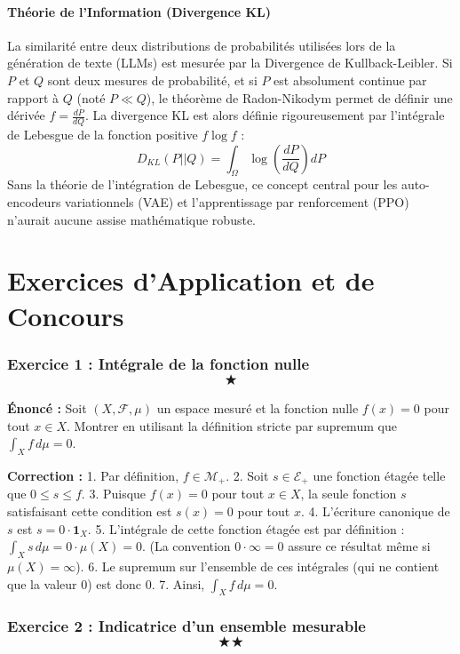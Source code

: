 \documentclass[11pt,a4paper]{article}
\begin{document}
\subsection{Théorie de l'Information (Divergence KL)}

La similarité entre deux distributions de probabilités utilisées lors de la génération de texte (LLMs) est mesurée par la Divergence de Kullback-Leibler. Si $P$ et $Q$ sont deux mesures de probabilité, et si $P$ est absolument continue par rapport à $Q$ (noté $P \ll Q$), le théorème de Radon-Nikodym permet de définir une dérivée $f = \frac{dP}{dQ}$.
La divergence KL est alors définie rigoureusement par l'intégrale de Lebesgue de la fonction positive $f \log f$ :
$$D_{KL}(P || Q) = \int_{\Omega} \log\left(\frac{dP}{dQ}\right) dP$$
Sans la théorie de l'intégration de Lebesgue, ce concept central pour les auto-encodeurs variationnels (VAE) et l'apprentissage par renforcement (PPO) n'aurait aucune assise mathématique robuste.


\newpage
\part{Exercices d'Application et de Concours}
\section{Exercice 1 : Intégrale de la fonction nulle \quad $$\bigstar$$}

\textbf{Énoncé :}
Soit $(X, \mathcal{F}, \mu)$ un espace mesuré et la fonction nulle $f(x) = 0$ pour tout $x \in X$.
Montrer en utilisant la définition stricte par supremum que $\int_X f \, d\mu = 0$.

\textbf{Correction :}
1. Par définition, $f \in \mathcal{M}_+$.
2. Soit $s \in \mathcal{E}_+$ une fonction étagée telle que $0 \le s \le f$.
3. Puisque $f(x) = 0$ pour tout $x \in X$, la seule fonction $s$ satisfaisant cette condition est $s(x) = 0$ pour tout $x$.
4. L'écriture canonique de $s$ est $s = 0 \cdot \mathbf{1}_X$.
5. L'intégrale de cette fonction étagée est par définition : $\int_X s \, d\mu = 0 \cdot \mu(X) = 0$. (La convention $0 \cdot \infty = 0$ assure ce résultat même si $\mu(X) = \infty$).
6. Le supremum sur l'ensemble de ces intégrales (qui ne contient que la valeur 0) est donc 0.
7. Ainsi, $\int_X f \, d\mu = 0$.


\section{Exercice 2 : Indicatrice d'un ensemble mesurable \quad $$\bigstar\bigstar$$}
\end{document}
